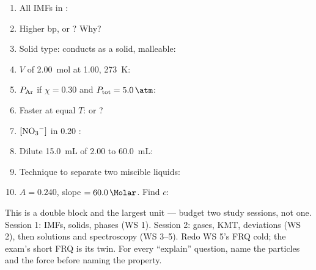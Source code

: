 \documentclass{apchem-worksheet}
\begin{document}
\begin{enumerate}[leftmargin=*,itemsep=0.4em]
  \item All IMFs in :
  \item Higher bp,  or ? Why?
  \item Solid type: conducts as a solid, malleable:
  \item $V$ of \SI{2.00}{\mole} at \SI{1.00}{\atm}, \SI{273}{\kelvin}:
  \item $P_{\ce{Ar}}$ if $\chi = 0.30$ and $P_{\text{tot}} =
        \SI{5.0}{\atm}$: 
  \item Faster at equal $T$:  or ?
  \item $[\ce{NO3-}]$ in \SI{0.20}{\Molar} :
  \item Dilute \SI{15.0}{\milli\liter} of \SI{2.00}{\Molar} to
        \SI{60.0}{\milli\liter}: 
  \item Technique to separate two miscible liquids:
  \item $A = 0.240$, slope $= \SI{60.0}{\per\Molar}$. Find $c$:
\end{enumerate}

\begin{apcnote}
This is a double block and the largest unit --- budget two study sessions,
not one. Session 1: IMFs, solids, phases (WS 1). Session 2: gases, KMT,
deviations (WS 2), then solutions and spectroscopy (WS 3--5). Redo WS 5's
FRQ cold; the exam's short FRQ is its twin. For every ``explain'' question,
name the particles and the force before naming the property.
\end{apcnote}
\end{document}

